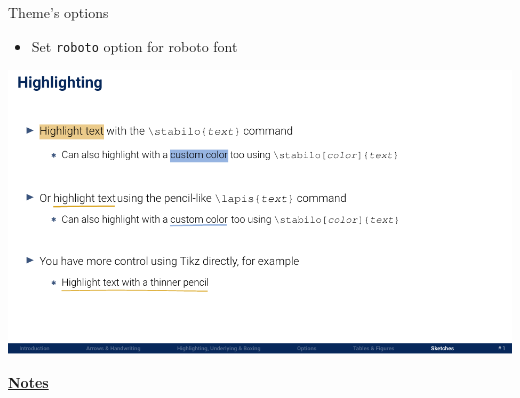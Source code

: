 \documentclass[10pt]{beamer}
\begin{document}
\begin{frame}
    {Theme's options}
    \begin{itemize}
        \item Set \texttt{roboto} option for roboto font 
    \end{itemize}
    \begin{center}
        \begin{minipage}[b]{.6\textwidth}
            \includegraphics[width=\textwidth]{roboto}
        \end{minipage}
    \end{center}
\end{frame}
\begin{flushleft}
    \underline{\textbf{Notes}}\setlength{\parskip}{.15cm}\notesize\newline\par
\end{flushleft}
\end{document}

